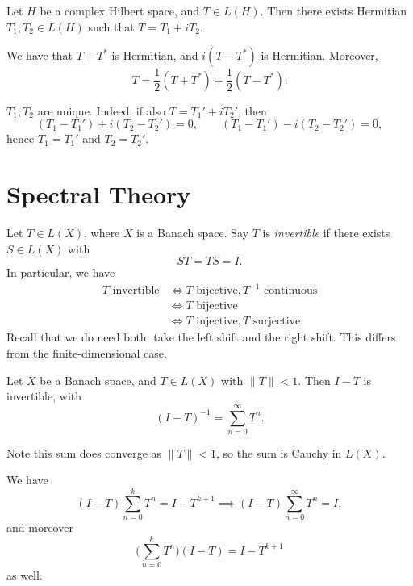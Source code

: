 \documentclass[12pt]{article}
\begin{document}
\begin{proposition}
	Let $H$ be a complex Hilbert space, and $T \in L(H)$. Then there exists Hermitian $T_1, T_2 \in L(H)$ such that $T = T_1 + i T_2$.
\end{proposition}

\begin{proofbox}
	We have that $T + T^{\ast}$ is Hermitian, and $i(T - T^{\ast})$ is Hermitian. Moreover,
	\[
	T = \frac{1}{2}(T + T^{\ast}) + \frac{1}{2}(T - T^{\ast}).
	\]
\end{proofbox}

\begin{remark}
	$T_1, T_2$ are unique. Indeed, if also $T = T_1' + i T_2'$, then
	\[
		(T_1 - T_1') + i(T_2 - T_2') = 0, \qquad (T_1 - T_1') - i (T_2 - T_2') = 0,
	\]
	hence $T_1 = T_1'$ and $T_2 = T_2'$.
\end{remark}

\newpage

\section{Spectral Theory}
\label{sec:spectral}

Let $T \in L(X)$, where $X$ is a Banach space. Say $T$ is \emph{invertible} if there exists $S \in L(X)$ with
\[
ST = TS = I.
\]
In particular, we have
\begin{align*}
	T \text{ invertible} &\iff T \text{ bijective}, T^{-1} \text{ continuous} \\
			     &\iff T \text{ bijective} \\
			     &\iff T \text{ injective}, T \text{ surjective}.
\end{align*}
Recall that we do need both: take the left shift and the right shift. This differs from the finite-dimensional case.

\begin{theorem}
	Let $X$ be a Banach space, and $T \in L(X)$ with $\|T\| < 1$. Then $I - T$ is invertible, with
	\[
		(I-T)^{-1} = \sum_{n = 0}^{\infty} T^{n}.
	\]
\end{theorem}

Note this sum does converge as $\|T\| < 1$, so the sum is Cauchy in $L(X)$.

\begin{proofbox}
	We have
	\[
		(I-T) \sum _{n = 0}^{k} T^{n} = I - T^{k+1} \implies (I-T) \sum_{n = 0}^{\infty} T^{n} = I,
	\]
	and moreover
	\[
		\Biggl(\sum_{n = 0}^{k} T^{n}\Biggr) (I - T) = I - T^{k+1}
	\]
	as well.
\end{proofbox}
\end{document}
